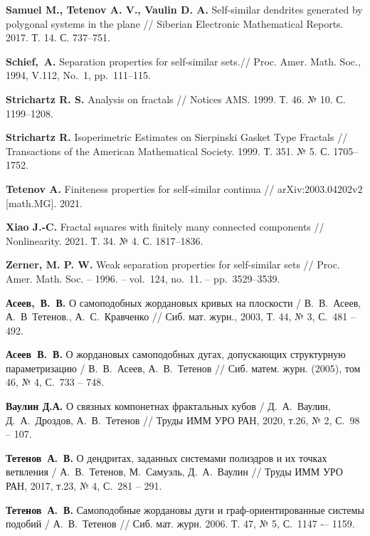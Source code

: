 \begin{thebibliography}{99}
{\bf Samuel M., Tetenov A. V., Vaulin D. A. }
Self-similar dendrites generated by polygonal systems in the plane //
Siberian Electronic Mathematical Reports. 2017. Т. 14. С. 737--751.

{\bf Schief,~A.}  Separation properties for self-similar sets.// 
Proc. Amer. Math. Soc., 1994, V.112, No.~1, pp.~111--115.

{\bf Strichartz R. S. }
Analysis on fractals // 
Notices AMS. 1999. Т. 46. № 10. С. 1199--1208.

{\bf Strichartz R. }
Isoperimetric Estimates on Sierpinski Gasket Type Fractals // 
Transactions of the American Mathematical Society. 1999. Т. 351. № 5. С. 1705--1752.

{\bf Tetenov A. }
Finiteness properties for self-similar continua // 
arXiv:2003.04202v2 [math.MG]. 2021.

{\bf Xiao J.-C. }
Fractal squares with finitely many connected components // 
Nonlinearity. 2021. Т. 34. № 4. С. 1817--1836.

{\bf Zerner, M. P. W.} 
Weak separation properties for self-similar sets // 
Proc. Amer. Math. Soc.  -- 1996. -- vol.~124, no.~11. -- pp.~3529--3539.


%
%
%
%
%
%
%
%
%
%
%

{\bf Асеев,~В.~В.} 
О самоподобных жордановых кривых на плоскости / 
В.~В.~Асеев, А.~В~Тетенов., А.~С.~Кравченко //
Сиб. мат. журн., 2003, Т. 44, № 3, С.~481 -- 492.

{\bf Асеев~В.~В.} 
О жордановых самоподобных дугах, допускающих структурную параметризацию /
В.~В.~Асеев, А.~В.~Тетенов //
Сиб. матем. журн. (2005), том 46, № 4, С.~733 -- 748.

{\bf Ваулин Д.А.}
О связных компонетнах фрактальных кубов / 
Д.~А.~Ваулин, Д.~А.~Дроздов, А.~В.~Тетенов //
Труды ИММ УРО РАН, 2020, т.26, № 2, С.~98 -- 107.

{\bf Тетенов~А.~В.}  
О дендритах, заданных системами полиэдров и их точках ветвления /
А.~В.~Тетенов, М.~Самуэль, Д.~А.~Ваулин // 
Труды ИММ УРО РАН, 2017, т.23, № 4, С.~281 -- 291.

{\bf Тетенов~А.~В.}
Самоподобные жордановы дуги и граф-ориентированные системы подобий /
А.~В.~Тетенов //
Сиб. мат. журн. 2006. Т. 47, № 5, С.~1147 -– 1159.


\end{thebibliography}
